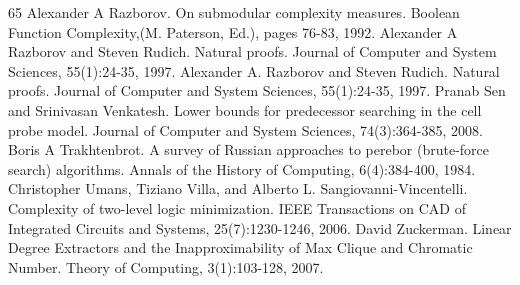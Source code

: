 \begin{thebibliography}{65}
 Alexander A Razborov. On submodular complexity measures. Boolean Function Complexity,(M. Paterson, Ed.), pages 76-83, 1992.
 Alexander A Razborov and Steven Rudich. Natural proofs. Journal of Computer and System Sciences, 55(1):24-35, 1997.
 Alexander A. Razborov and Steven Rudich. Natural proofs. Journal of Computer and System Sciences, 55(1):24-35, 1997.
 Pranab Sen and Srinivasan Venkatesh. Lower bounds for predecessor searching in the cell probe model. Journal of Computer and System Sciences, 74(3):364-385, 2008.
 Boris A Trakhtenbrot. A survey of Russian approaches to perebor (brute-force search) algorithms. Annals of the History of Computing, 6(4):384-400, 1984.
 Christopher Umans, Tiziano Villa, and Alberto L. Sangiovanni-Vincentelli. Complexity of two-level logic minimization. IEEE Transactions on CAD of Integrated Circuits and Systems, 25(7):1230-1246, 2006.
 David Zuckerman. Linear Degree Extractors and the Inapproximability of Max Clique and Chromatic Number. Theory of Computing, 3(1):103-128, 2007.
\end{thebibliography}
